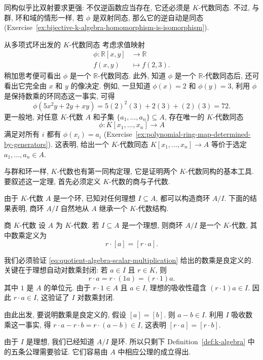 同构似乎比双射要求更强: 不仅逆函数应当存在, 它还必须是 $K$-代数同态. 不过, 与群, 环和域的情形一样, 若 $\phi$ 是双射同态, 那么它的逆自动是同态 (Exercise~\ref{ex:bijective-k-algebra-homomorphism-is-isomorphism}).

\begin{Example}{从多项式环出发的 $K$-代数同态}\leavevmode\label{ex:k-algebra-evaluation-homomorphisms}
  考虑求值映射
  \[
    \begin{aligned}
      \phi:\mathbb{R}[x,y]&\to\mathbb{R}\\
      f(x,y)&\mapsto f(2,3).
    \end{aligned}
  \]
  稍加思考便可看出 $\phi$ 是一个 $\mathbb{R}$-代数同态. 此外, 知道 $\phi$ 是一个 $\mathbb{R}$-代数同态后, 还可看出它完全由 $x$ 和 $y$ 的像决定. 例如, 一旦知道 $\phi(x)=2$ 和 $\phi(y)=3$, 利用 $\phi$ 是保持数乘的环同态这一事实, 可得
  \[
    \phi(5x^{2}y+2y+xy)=5(2)^{2}(3)+2(3)+(2)(3)=72.
  \]
  更一般地, 对任意 $K$-代数 $A$ 和子集 $\{a_{1},\ldots,a_{n}\}\subseteq A$, 存在唯一的 $K$-代数同态
  \[
    \phi:K[x_{1},\ldots,x_{n}]\to A
  \]
  满足对所有 $i$ 都有 $\phi(x_{i})=a_{i}$ (Exercise~\ref{ex:polynomial-ring-map-determined-by-generators}). 这表明, 给出一个 $K$-代数同态 $K[x_{1},\ldots,x_{n}]\to A$ 等价于选定 $a_{1},\ldots,a_{n}\in A$.
\end{Example}

与群和环一样, $K$-代数也有第一同构定理, 它是证明两个 $K$-代数同构的基本工具. 要叙述这一定理, 首先必须定义 $K$-代数的商与子代数.

由于 $K$-代数 $A$ 是一个环, 已知对任何理想 $I\subseteq A$, 都可以构造商环 $A/I$. 下面的结果表明, 商环 $A/I$ 自然地从 $A$ 继承一个 $K$-代数结构.

\begin{Proposition}{商 $K$-代数}\leavevmode\label{prop:quotient-k-algebra}
  设 $A$ 为 $K$-代数. 若 $I\subseteq A$ 是一个理想, 则商环 $A/I$ 是一个 $K$-代数, 其中数乘定义为
  \begin{equation}\label{eq:quotient-algebra-scalar-multiplication}
    r\cdot[a]=[r\cdot a].
  \end{equation}
\end{Proposition}

\begin{Proof}
  我们必须验证 \eqref{eq:quotient-algebra-scalar-multiplication} 给出的数乘是良定义的. 关键在于理想自动对数乘封闭: 若 $a\in I$ 且 $r\in K$, 则
  \[
    r\cdot a=r\cdot(1a)=(r\cdot1)a.
  \]
  其中 $1$ 是 $A$ 的单位元. 由于 $r\cdot1\in A$ 且 $a\in I$, 理想的吸收性蕴含 $(r\cdot1)a\in I$. 因此 $r\cdot a\in I$, 这验证了 $I$ 对数乘封闭.

  由此出发, 要说明数乘是良定义的, 假设 $[a]=[b]$. 则 $a-b\in I$. 利用 $I$ 吸收数乘这一事实, 得 $r\cdot a-r\cdot b=r\cdot(a-b)\in I$, 这表明 $[r\cdot a]=[r\cdot b]$.

  由于 $I$ 是理想, 我们已经知道 $A/I$ 是环. 所以只剩下 Definition~\ref{def:k-algebra} 中的五条公理需要验证. 它们容易由 $A$ 中相应公理的成立得出.
\end{Proof}

